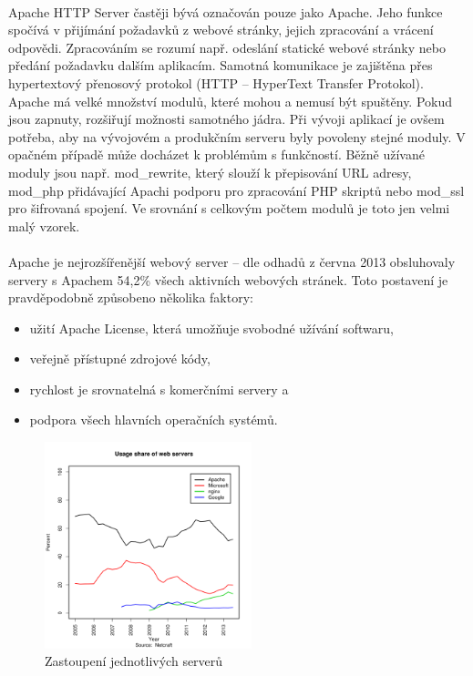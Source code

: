\documentclass[11pt,a4paper,titlepage,oneside]{book}
\begin{document}
		\paragraph{} Apache HTTP Server častěji bývá označován pouze jako Apache. Jeho funkce spočívá v přijímání požadavků z webové stránky, jejich zpracování a vrácení odpovědi. Zpracováním se rozumí např. odeslání statické webové stránky nebo předání požadavku dalším aplikacím. Samotná komunikace je zajištěna přes hypertextový přenosový protokol (HTTP -- HyperText Transfer Protokol). Apache má velké množství modulů, které mohou a nemusí být spuštěny. Pokud jsou zapnuty, rozšiřují možnosti samotného jádra. Při vývoji aplikací je ovšem potřeba, aby na vývojovém a produkčním serveru byly povoleny stejné moduly. V opačném případě může docházet k problémům s funkčností. Běžně užívané moduly jsou např. mod\_rewrite, který slouží k přepisování URL adresy, mod\_php přidávající Apachi podporu pro zpracování PHP skriptů nebo mod\_ssl pro šifrovaná spojení. Ve srovnání s celkovým počtem modulů je toto jen velmi malý vzorek.

		\paragraph{} Apache je nejrozšířenější webový server -- dle odhadů z června 2013 obsluhovaly servery s Apachem 54,2\% všech aktivních webových stránek. Toto postavení je pravděpodobně způsobeno několika faktory:
		\begin{itemize}
			\item užití Apache License, která umožňuje svobodné užívání softwaru,
			\item veřejně přístupné zdrojové kódy,
			\item rychlost je srovnatelná s komerčními servery a 
			\item podpora všech hlavních operačních systémů.
		\end{itemize}
		
		\begin{figure}[!h]
			\begin{center}
				\includegraphics[width=6cm]{obrazky/servers_share.png}
				\caption{Zastoupení jednotlivých serverů}
			\end{center}
		\end{figure}
\end{document}
